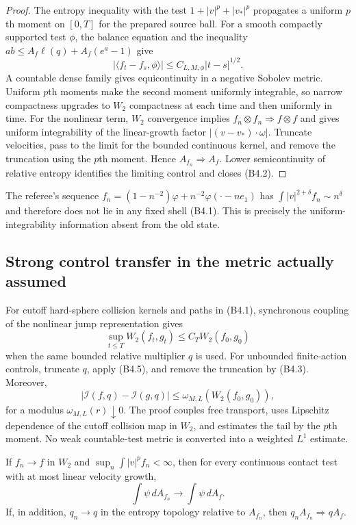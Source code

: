 \begin{proof}
The entropy inequality with the test
$1+|v|^p+|v_*|^p$ propagates a uniform $p$th moment on $[0,T]$ for the prepared
source ball.  For a smooth compactly supported test $\phi$, the balance
equation and the inequality
$ab\le A_f\ell(q)+A_f(e^a-1)$ give
\[
 |\langle f_t-f_s,\phi\rangle|
 \le C_{L,M,\phi}|t-s|^{1/2}.                            \tag{B4.4}
\]
A countable dense family gives equicontinuity in a negative Sobolev metric.
Uniform $p$th moments make the second moment uniformly integrable, so narrow
compactness upgrades to $W_2$ compactness at each time and then uniformly in
time.  For the nonlinear term, $W_2$ convergence implies
$f_n\otimes f_n\Rightarrow f\otimes f$ and gives uniform integrability of the
linear-growth factor $|(v-v_*)\cdot\omega|$.  Truncate velocities, pass to the
limit for the bounded continuous kernel, and remove the truncation using the
$p$th moment.  Hence $A_{f_n}\Rightarrow A_f$.  Lower semicontinuity of
relative entropy identifies the limiting control and closes (B4.2).
\end{proof}

The referee's sequence
$f_n=(1-n^{-2})\varphi+n^{-2}\varphi(\cdot-ne_1)$ has
$\int|v|^{2+\delta}f_n\sim n^\delta$ and therefore does not lie in any fixed
shell (B4.1).  This is precisely the uniform-integrability information absent
from the old state.

\subsection{Strong control transfer in the metric actually assumed}

For cutoff hard-sphere collision kernels and paths in (B4.1), synchronous
coupling of the nonlinear jump representation gives
\[
 \sup_{t\le T}W_2(f_t,g_t)
 \le C_T W_2(f_0,g_0)                                    \tag{B4.5}
\]
when the same bounded relative multiplier $q$ is used.  For unbounded
finite-action controls, truncate $q$, apply (B4.5), and remove the truncation
by (B4.3).  Moreover,
\[
 |\mathcal I(f,q)-\mathcal I(g,q)|
 \le\omega_{M,L}(W_2(f_0,g_0)),                           \tag{B4.6}
\]
for a modulus $\omega_{M,L}(r)\downarrow0$.  The proof couples free transport,
uses Lipschitz dependence of the cutoff collision map in $W_2$, and estimates
the tail by the $p$th moment.  No weak countable-test metric is converted into
a weighted $L^1$ estimate.

\begin{proposition}
\label{prop:r23-b4-product}
If $f_n\to f$ in $W_2$ and
$\sup_n\int|v|^p f_n<\infty$, then for every continuous contact test with at
most linear velocity growth,
\[
 \int\psi\,dA_{f_n}\longrightarrow\int\psi\,dA_f.       \tag{B4.7}
\]
If, in addition, $q_n\to q$ in the entropy topology relative to $A_{f_n}$,
then $q_nA_{f_n}\Rightarrow qA_f$.
\end{proposition}

